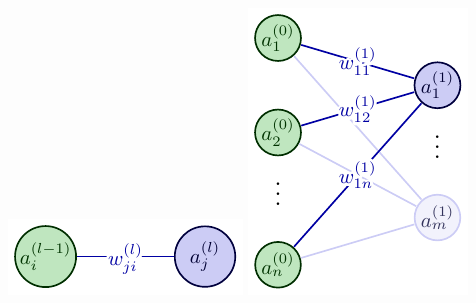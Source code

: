 \begin{minipage}{0.4\textwidth}
\includegraphics[width=\textwidth]{tikz/chapter2 - Indexing.pdf}
\vspace{0.8cm}
\includegraphics[width=\textwidth]{tikz/chapter2 - Indexing Example.pdf}
\end{minipage}
\begin{minipage}{0.05\textwidth}
\
\end{minipage}
